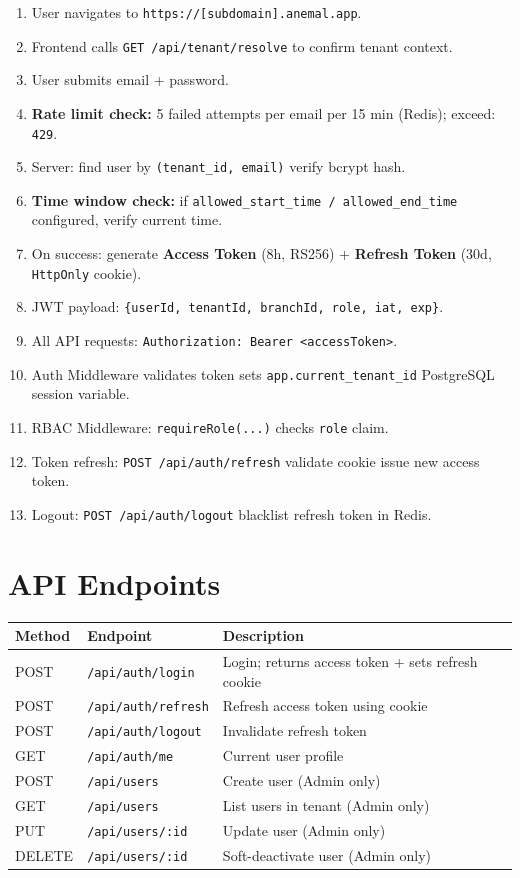 \documentclass[12pt,a4paper]{report}
\begin{document}
\begin{enumerate}
  \item User navigates to \texttt{https://[subdomain].anemal.app}.
  \item Frontend calls \texttt{GET /api/tenant/resolve} to confirm tenant context.
  \item User submits email + password.
  \item \textbf{Rate limit check:} 5 failed attempts per email per 15 min (Redis); exceed: \texttt{429}.
  \item Server: find user by \texttt{(tenant\_id, email)} \textrightarrow{} verify bcrypt hash.
  \item \textbf{Time window check:} if \texttt{allowed\_start\_time / allowed\_end\_time} configured, verify current time.
  \item On success: generate \textbf{Access Token} (8h, RS256) + \textbf{Refresh Token} (30d, \texttt{HttpOnly} cookie).
  \item JWT payload: \texttt{\{userId, tenantId, branchId, role, iat, exp\}}.
  \item All API requests: \texttt{Authorization: Bearer <accessToken>}.
  \item Auth Middleware validates token \textrightarrow{} sets \texttt{app.current\_tenant\_id} PostgreSQL session variable.
  \item RBAC Middleware: \texttt{requireRole(...)} checks \texttt{role} claim.
  \item Token refresh: \texttt{POST /api/auth/refresh} \textrightarrow{} validate cookie \textrightarrow{} issue new access token.
  \item Logout: \texttt{POST /api/auth/logout} \textrightarrow{} blacklist refresh token in Redis.
\end{enumerate}

\section{API Endpoints}

\begin{longtable}{L{1.5cm} L{5cm} L{7.5cm}}
\toprule
\textbf{Method} & \textbf{Endpoint} & \textbf{Description} \\\midrule\endhead\bottomrule\endfoot
POST   & \texttt{/api/auth/login}     & Login; returns access token + sets refresh cookie \\
POST   & \texttt{/api/auth/refresh}   & Refresh access token using cookie \\
POST   & \texttt{/api/auth/logout}    & Invalidate refresh token \\
GET    & \texttt{/api/auth/me}        & Current user profile \\
POST   & \texttt{/api/users}          & Create user (Admin only) \\
GET    & \texttt{/api/users}          & List users in tenant (Admin only) \\
PUT    & \texttt{/api/users/:id}      & Update user (Admin only) \\
DELETE & \texttt{/api/users/:id}      & Soft-deactivate user (Admin only) \\
\end{longtable}
\end{document}
